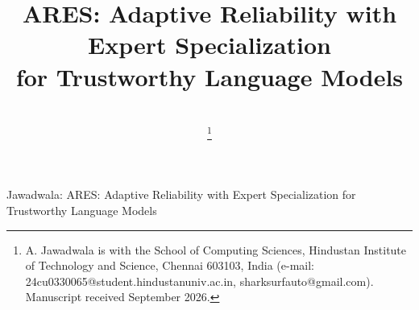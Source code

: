 \documentclass[journal,10pt,twocolumn]{IEEEtran}
\begin{document}
\title{ARES: Adaptive Reliability with Expert Specialization\\for Trustworthy Language Models}

\author{
     \\
    \thanks{A. Jawadwala is with the School of Computing Sciences, Hindustan Institute of Technology and Science, Chennai 603103, India (e-mail: 24cu0330065@student.hindustanuniv.ac.in, sharksurfauto@gmail.com). Manuscript received September 2026.}
}

%
{Jawadwala: ARES: Adaptive Reliability with Expert Specialization for Trustworthy Language Models}

\maketitle
\end{document}
